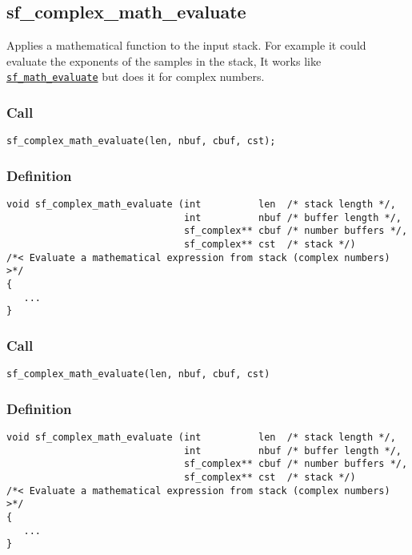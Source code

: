 \subsection{{sf\_complex\_math\_evaluate}}
Applies a mathematical function to the input stack. For example it could evaluate the exponents of the samples in the stack, It works like \hyperref[sec:sf_math_evaluate]{\texttt{sf\_math\_evaluate}} but does it for complex numbers.

\subsubsection*{Call}
\begin{verbatim}sf_complex_math_evaluate(len, nbuf, cbuf, cst);\end{verbatim}

\subsubsection*{Definition}
\begin{verbatim}
void sf_complex_math_evaluate (int          len  /* stack length */, 
                               int          nbuf /* buffer length */, 
                               sf_complex** cbuf /* number buffers */, 
                               sf_complex** cst  /* stack */)
/*< Evaluate a mathematical expression from stack (complex numbers) >*/
{
   ...
}
\end{verbatim}

\subsubsection*{Call}
\begin{verbatim}sf_complex_math_evaluate(len, nbuf, cbuf, cst)\end{verbatim}

\subsubsection*{Definition}
\begin{verbatim}
void sf_complex_math_evaluate (int          len  /* stack length */, 
                               int          nbuf /* buffer length */, 
                               sf_complex** cbuf /* number buffers */, 
                               sf_complex** cst  /* stack */)
/*< Evaluate a mathematical expression from stack (complex numbers) >*/
{
   ...
}
\end{verbatim}

